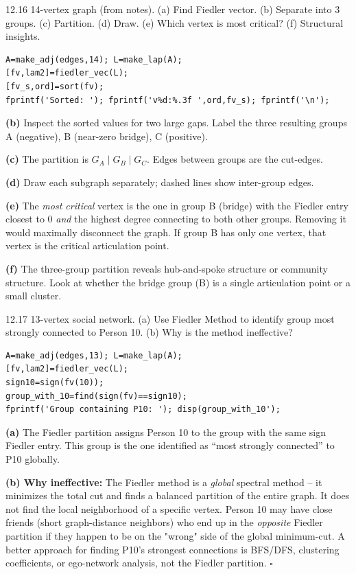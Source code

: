 \begin{exercise}{12.16}
14-vertex graph (from notes). (a) Find Fiedler vector. (b) Separate into 3 groups. (c) Partition. (d) Draw. (e) Which vertex is most critical? (f) Structural insights.
\end{exercise}
\begin{solution}
\begin{lstlisting}
A=make_adj(edges,14); L=make_lap(A);
[fv,lam2]=fiedler_vec(L);
[fv_s,ord]=sort(fv);
fprintf('Sorted: '); fprintf('v%d:%.3f ',ord,fv_s); fprintf('\n');
\end{lstlisting}

\textbf{(b)} Inspect the sorted values for two large gaps. Label the three resulting groups A (negative), B (near-zero bridge), C (positive).

\textbf{(c)} The partition is $G_A \mid G_B \mid G_C$. Edges between groups are the cut-edges.

\textbf{(d)} Draw each subgraph separately; dashed lines show inter-group edges.

\textbf{(e)} The \textit{most critical} vertex is the one in group B (bridge) with the Fiedler entry closest to 0 \textit{and} the highest degree connecting to both other groups. Removing it would maximally disconnect the graph. If group B has only one vertex, that vertex is the critical articulation point.

\textbf{(f)} The three-group partition reveals hub-and-spoke structure or community structure. Look at whether the bridge group (B) is a single articulation point or a small cluster.
\end{solution}

\begin{exercise}{12.17}
13-vertex social network. (a) Use Fiedler Method to identify group most strongly connected to Person 10. (b) Why is the method ineffective?
\end{exercise}
\begin{solution}
\begin{lstlisting}
A=make_adj(edges,13); L=make_lap(A);
[fv,lam2]=fiedler_vec(L);
sign10=sign(fv(10));
group_with_10=find(sign(fv)==sign10);
fprintf('Group containing P10: '); disp(group_with_10');
\end{lstlisting}

\textbf{(a)} The Fiedler partition assigns Person 10 to the group with the same sign Fiedler entry. This group is the one identified as ``most strongly connected'' to P10 globally.

\textbf{(b) Why ineffective:} The Fiedler method is a \textit{global} spectral method -- it minimizes the total cut and finds a balanced partition of the entire graph. It does not find the local neighborhood of a specific vertex. Person 10 may have close friends (short graph-distance neighbors) who end up in the \textit{opposite} Fiedler partition if they happen to be on the "wrong" side of the global minimum-cut. A better approach for finding P10's strongest connections is BFS/DFS, clustering coefficients, or ego-network analysis, not the Fiedler partition. $\square$
\end{solution}

